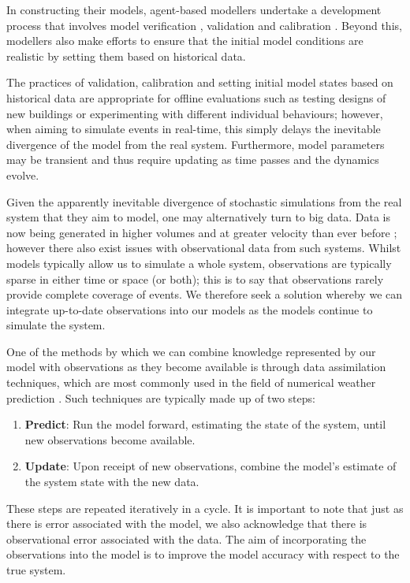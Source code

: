 \documentclass[12pt, twoside, a4paper]{article}
\begin{document}
In constructing their models, agent-based modellers undertake a development
process that involves model verification \citep{xiang2005verification},
validation \citep{crooks2008key} and calibration \citep{thiele2014facilitating}.
Beyond this, modellers also make efforts to ensure that the initial model
conditions are realistic by setting them based on historical data.

The practices of validation, calibration and setting initial model states based
on historical data are appropriate for offline evaluations such as testing
designs of new buildings or experimenting with different individual behaviours;
however, when aiming to simulate events in real-time, this simply delays the
inevitable divergence of the model from the real system.
Furthermore, model parameters may be transient and thus require updating as
time passes and the dynamics evolve.

Given the apparently inevitable divergence of stochastic simulations from the
real system that they aim to model, one may alternatively turn to big data.
Data is now being generated in higher volumes and at greater velocity than ever
before \citep{chen2014big}; however there also exist issues with observational
data from such systems.
Whilst models typically allow us to simulate a whole system, observations are
typically sparse in either time or space (or both); this is to say that
observations rarely provide complete coverage of events.
We therefore seek a solution whereby we can integrate up-to-date observations
into our models as the models continue to simulate the system.

One of the methods by which we can combine knowledge represented by our model
with observations as they become available is through data assimilation
techniques, which are most commonly used in the field of numerical weather
prediction \citep{kalnay2003atmospheric}.
Such techniques are typically made up of two steps:
\begin{enumerate}
    \item \textbf{Predict}: Run the model forward, estimating the state of the
        system, until new observations become available.
    \item \textbf{Update}: Upon receipt of new observations, combine the model's
        estimate of the system state with the new data.
\end{enumerate}
These steps are repeated iteratively in a cycle.
It is important to note that just as there is error associated with the model,
we also acknowledge that there is observational error associated with the data.
The aim of incorporating the observations into the model is to improve the model
accuracy with respect to the true system.
\end{document}
